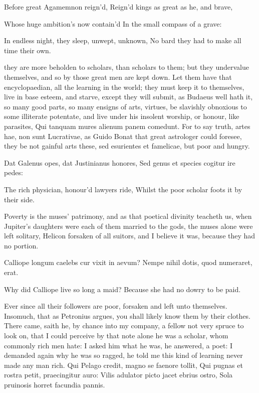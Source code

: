 {{Before great Agamemnon reign'd,
Reign'd kings as great as he, and brave,

Whose huge ambition's now contain'd
In the small compass of a grave:

In endless night, they sleep, unwept, unknown,
No bard they had to make all time their own.

they are more beholden to scholars, than scholars to them; but they
undervalue themselves, and so by those great men are kept down. Let
them have that encyclopaedian, all the learning in the world; they must
keep it to themselves, live in base esteem, and starve, except
they will submit, as Budaeus well hath it, so many good parts, so many
ensigns of arts, virtues, be slavishly obnoxious to some illiterate
potentate, and live under his insolent worship, or honour, like
parasites, Qui tanquam mures alienum panem comedunt. For to say truth,
artes hae, non sunt Lucrativae, as Guido Bonat that great astrologer
could foresee, they be not gainful arts these, sed esurientes et
famelicae, but poor and hungry.

Dat Galenus opes, dat Justinianus honores,
Sed genus et species cogitur ire pedes:


The rich physician, honour'd lawyers ride,
Whilst the poor scholar foots it by their side.

Poverty is the muses' patrimony, and as that poetical divinity teacheth
us, when Jupiter's daughters were each of them married to the gods, the
muses alone were left solitary, Helicon forsaken of all suitors, and I
believe it was, because they had no portion.

Calliope longum caelebs cur vixit in aevum?
Nempe nihil dotis, quod numeraret, erat.


Why did Calliope live so long a maid?
Because she had no dowry to be paid.

Ever since all their followers are poor, forsaken and left unto
themselves. Insomuch, that as Petronius argues, you shall likely
know them by their clothes. There came, saith he, by chance into my
company, a fellow not very spruce to look on, that I could perceive by
that note alone he was a scholar, whom commonly rich men hate: I asked
him what he was, he answered, a poet: I demanded again why he was so
ragged, he told me this kind of learning never made any man rich.
Qui Pelago credit, magno se faenore tollit,
Qui pugnas et rostra petit, praecingitur auro:
Vilis adulator picto jacet ebrius ostro,
Sola pruinosis horret facundia pannis.


}}
